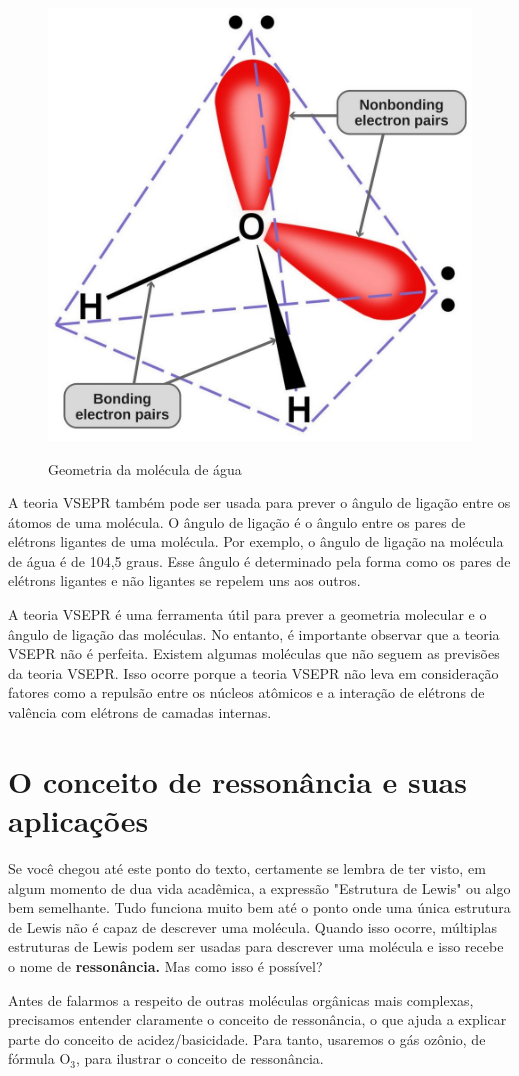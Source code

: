 \documentclass[a4paper,12pt]{book}
\begin{document}
\begin{figure}[h]
	\centering
	\caption{Geometria da molécula de água}
	\includegraphics[width=0.45\linewidth]{imagens/is_water_a_tetrahedral_molecule.jpg}
	\label{fig:vsepragua}
\end{figure}

A teoria \label{vsepr}VSEPR também pode ser usada para prever o ângulo de ligação entre os átomos de uma molécula. O ângulo de ligação é o ângulo entre os pares de elétrons ligantes de uma molécula. Por exemplo, o ângulo de ligação na molécula de água é de 104,5 graus. Esse ângulo é determinado pela forma como os pares de elétrons ligantes e não ligantes se repelem uns aos outros.

A teoria VSEPR é uma ferramenta útil para prever a geometria molecular e o ângulo de ligação das moléculas. No entanto, é importante observar que a teoria VSEPR não é perfeita. Existem algumas moléculas que não seguem as previsões da teoria VSEPR. Isso ocorre porque a teoria VSEPR não leva em consideração fatores como a repulsão entre os núcleos atômicos e a interação de elétrons de valência com elétrons de camadas internas.

\section{O conceito de ressonância e suas aplicações}
Se você chegou até este ponto do texto, certamente se lembra de ter visto, em algum momento de dua vida acadêmica, a expressão "Estrutura de Lewis" ou algo bem semelhante. Tudo funciona muito bem até o ponto onde uma única estrutura de Lewis não é capaz de descrever uma molécula. Quando isso ocorre, múltiplas estruturas de Lewis podem ser usadas para descrever uma molécula e isso recebe o nome de \textbf{ressonância. }Mas como isso é possível?

Antes de falarmos a respeito de outras moléculas orgânicas mais complexas, precisamos entender claramente o conceito de ressonância, o que ajuda a explicar parte do conceito de acidez/basicidade. Para tanto, usaremos o gás ozônio, de fórmula O{$_3$}, para ilustrar o conceito de ressonância.
\end{document}
